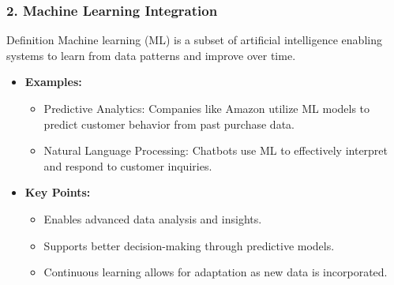\documentclass[aspectratio=169]{beamer}
\begin{document}
\begin{frame}[fragile]
    \frametitle{2. Machine Learning Integration}
    \begin{block}{Definition}
        Machine learning (ML) is a subset of artificial intelligence enabling systems to learn from data patterns and improve over time.
    \end{block}
    
    \begin{itemize}
        \item \textbf{Examples:}
        \begin{itemize}
            \item Predictive Analytics: Companies like Amazon utilize ML models to predict customer behavior from past purchase data.
            \item Natural Language Processing: Chatbots use ML to effectively interpret and respond to customer inquiries.
        \end{itemize}
        
        \item \textbf{Key Points:}
        \begin{itemize}
            \item Enables advanced data analysis and insights.
            \item Supports better decision-making through predictive models.
            \item Continuous learning allows for adaptation as new data is incorporated.
        \end{itemize}
    \end{itemize}
\end{frame}
\end{document}
